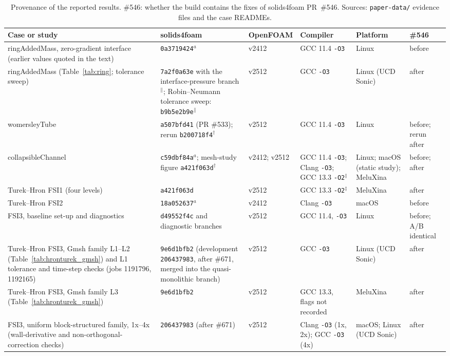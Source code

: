 \begin{table}[htbp]
	\centering
	\footnotesize
	\setlength{\tabcolsep}{3pt}
	\caption{Provenance of the reported results. \#546: whether the build contains the fixes of solids4foam PR~\#546. Sources: \texttt{paper-data/} evidence files and the case READMEs.}
	\label{tab:provenance}
	\begin{tabular}{p{2.9cm}p{2.5cm}p{1.5cm}p{2.4cm}p{1.8cm}p{2.1cm}}
		\toprule
		Case or study & solids4foam & OpenFOAM & Compiler & Platform & \#546 \\
		\midrule
		ringAddedMass, zero-gradient interface (earlier values quoted in the text) & \texttt{0a3719424}$^a$ & v2412 & GCC 11.4 \texttt{-O3} & Linux & before \\
		ringAddedMass (Table~\ref{tab:ring}; tolerance sweep) & \texttt{7a2f0a63e} with the interface-pressure branch$^\|$; Robin--Neumann tolerance sweep: \texttt{b9b5e2b9e}$^\|$ & v2512 & GCC \texttt{-O3} & Linux (UCD Sonic) & after \\
		womersleyTube & \texttt{a507bfd41} (PR \#533); rerun \texttt{b200718f4}$^\dagger$ & v2512 & GCC 11.4 \texttt{-O3} & Linux & before; rerun after \\
		collapsibleChannel & \texttt{c59dbf84a}$^a$; mesh-study figure \texttt{a421f063d}$^\dagger$ & v2412; v2512 & GCC 11.4 \texttt{-O3}; Clang \texttt{-O3}; GCC 13.3 \texttt{-O2}$^\ddagger$ & Linux; macOS (static study); MeluXina & before; after \\
		Turek--Hron FSI1 (four levels) & \texttt{a421f063d} & v2512 & GCC 13.3 \texttt{-O2}$^\ddagger$ & MeluXina & after \\
		Turek--Hron FSI2 & \texttt{18a052637}$^a$ & v2412 & Clang \texttt{-O3} & macOS & before \\
		FSI3, baseline set-up and diagnostics & \texttt{d49552f4c} and diagnostic branches & v2512 & GCC 11.4, \texttt{-O3} & Linux & before; A/B identical \\
		Turek--Hron FSI3, Gmsh family L1--L2 (Table~\ref{tab:hronturek_gmsh}) and L1 tolerance and time-step checks (jobs 1191796, 1192165) & \texttt{9e6d1bfb2} (development \texttt{206437983}, after \#671, merged into the quasi-monolithic branch) & v2512 & GCC \texttt{-O3} & Linux (UCD Sonic) & after \\
		Turek--Hron FSI3, Gmsh family L3 (Table~\ref{tab:hronturek_gmsh}) & \texttt{9e6d1bfb2} & v2512 & GCC 13.3, flags not recorded & MeluXina & after \\
		FSI3, uniform block-structured family, 1x--4x (wall-derivative and non-orthogonal-correction checks) & \texttt{206437983} (after \#671) & v2512 & Clang \texttt{-O3} (1x, 2x); GCC \texttt{-O3} (4x) & macOS; Linux (UCD Sonic) & after \\

\end{tabular}
\end{table}
